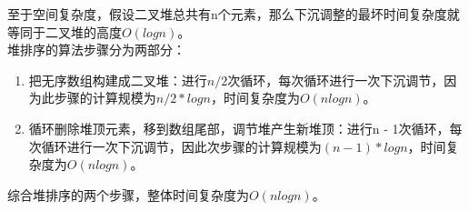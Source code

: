 至于空间复杂度，假设二叉堆总共有n个元素，那么下沉调整的最坏时间复杂度就等同于二叉堆的高度$ O(logn) $。\\

堆排序的算法步骤分为两部分：

\begin{enumerate}
	\item 把无序数组构建成二叉堆：进行$ n / 2 $次循环，每次循环进行一次下沉调节，因为此步骤的计算规模为$ n/2 * logn $，时间复杂度为$ O(nlogn) $。

	\item 循环删除堆顶元素，移到数组尾部，调节堆产生新堆顶：进行n - 1次循环，每次循环进行一次下沉调节，因此次步骤的计算规模为$ (n-1) * logn $，时间复杂度为$ O(nlogn) $。
\end{enumerate}

综合堆排序的两个步骤，整体时间复杂度为$ O(nlogn) $。

\newpage